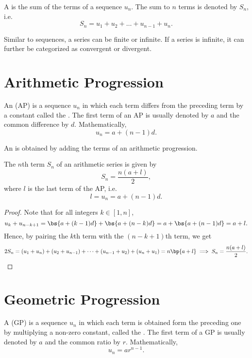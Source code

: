 \begin{definition}
    A  is the sum of the terms of a sequence $u_n$. The sum to $n$ terms is denoted by $S_n$, i.e. \[S_n = u_1 + u_2 + \dots + u_{n-1} + u_n.\]
\end{definition}

Similar to sequences, a series can be finite or infinite. If a series is infinite, it can further be categorized as convergent or divergent.

\section{Arithmetic Progression}

\begin{definition}
    An  (AP) is a sequence $u_n$ in which each term differs from the preceding term by a constant called the . The first term of an AP is usually denoted by $a$ and the common difference by $d$. Mathematically, \[u_n = a + (n-1)d.\]
\end{definition}

\begin{definition}
    An  is obtained by adding the terms of an arithmetic progression.
\end{definition}

\begin{proposition}
    The $n$th term $S_n$ of an arithmetic series is given by \[S_n = \frac{n(a + l)}{2},\] where $l$ is the last term of the AP, i.e. \[l = u_n = a + (n-1) d.\]
\end{proposition}
\begin{proof}
    Note that for all integers $k \in [1, n]$, \[u_k + u_{n - k + 1} = \bs{a + (k-1)d} + \bs{a + (n-k)d} = a + \bs{a + (n-1)d} = a + l.\] Hence, by pairing the $k$th term with the $(n-k+1)$th term, we get \[2S_n = (u_1 + u_n) + (u_2 + u_{n-1}) + \dots + (u_{n-1} + u_2) + (u_n + u_1) = n\bp{a + l} \implies S_n = \frac{n(a + l)}{2}.\]
\end{proof}

\section{Geometric Progression}

\begin{definition}
    A  (GP) is a sequence $u_n$ in which each term is obtained form the preceding one by multiplying a non-zero constant, called the . The first term of a GP is usually denoted by $a$ and the common ratio by $r$. Mathematically, \[u_n = ar^{n-1}.\]
\end{definition}

